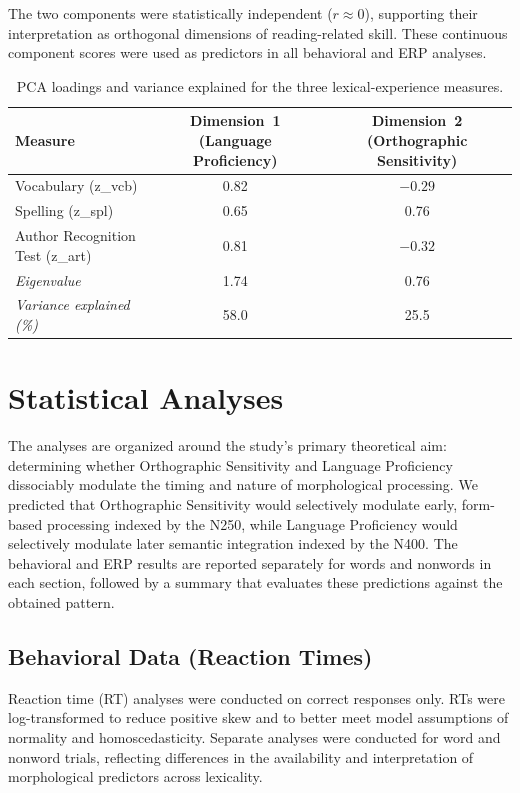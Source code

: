 \documentclass[utf8]{FrontiersinHarvard} %
\begin{document}
The two components were statistically independent ($r \approx 0$), supporting their interpretation as orthogonal dimensions of reading-related skill. These continuous component scores were used as predictors in all behavioral and ERP analyses.


\begin{table}[ht]
	\centering
	\caption{PCA loadings and variance explained for the three lexical-experience measures.}
	\label{tab:pca_loadings}
	\begin{tabular}{lcc}
		\toprule
		\textbf{Measure} & \textbf{Dimension~1 (Language Proficiency)} & \textbf{Dimension~2 (Orthographic Sensitivity)} \\
		\midrule
		Vocabulary (z\_vcb) & 0.82 & $-0.29$ \\
		Spelling (z\_spl) & 0.65 & 0.76 \\
		Author Recognition Test (z\_art) & 0.81 & $-0.32$ \\
		\midrule
		\textit{Eigenvalue} & 1.74 & 0.76 \\
		\textit{Variance explained (\%)} & 58.0 & 25.5 \\
		\bottomrule
	\end{tabular}
\end{table}

\section{Statistical Analyses}

The analyses are organized around the study’s primary theoretical aim: determining whether Orthographic Sensitivity and Language Proficiency dissociably modulate the timing and nature of morphological processing. We predicted that Orthographic Sensitivity would selectively modulate early, form-based processing indexed by the N250, while Language Proficiency would selectively modulate later semantic integration indexed by the N400. The behavioral and ERP results are reported separately for words and nonwords in each section, followed by a summary that evaluates these predictions against the obtained pattern.

\subsection{Behavioral Data (Reaction Times)}
Reaction time (RT) analyses were conducted on correct responses only. RTs were log-transformed to reduce positive skew and to better meet model assumptions of normality and homoscedasticity. Separate analyses were conducted for word and nonword trials, reflecting differences in the availability and interpretation of morphological predictors across lexicality.
\end{document}
